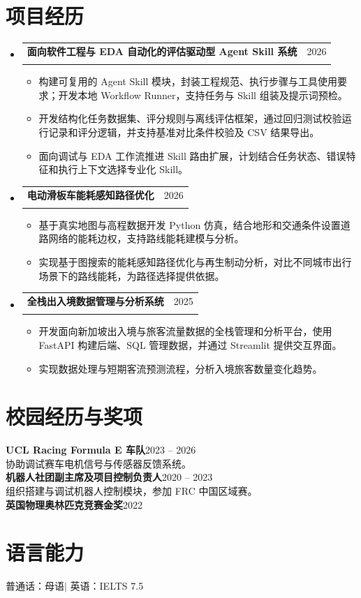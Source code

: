 ﻿\documentclass[a4paper,11pt]{article}
\makeatletter
\newcommand{\CVItem}[1]{\item\small #1}
\newcommand{\CVProjectHeading}[3]{%
  \item\begin{tabularx}{\textwidth}{@{}>{\raggedright\arraybackslash}X@{\hspace{1em}}r@{}}
    \textbf{#1} & #3 \\
    \multicolumn{2}{@{}l@{}}{\small #2}
  \end{tabularx}\vspace{-3pt}}
\newcommand{\CVSubHeadingListStart}{\begin{itemize}[leftmargin=0pt,label={},itemsep=4pt,topsep=0pt,parsep=0pt,partopsep=0pt]}
\newcommand{\CVSubHeadingListEnd}{\end{itemize}}
\newcommand{\CVItemListStart}{\begin{itemize}[leftmargin=0.4cm,label=\textbullet,itemsep=1pt,topsep=2pt,parsep=0pt,partopsep=0pt]}
\newcommand{\CVItemListEnd}{\end{itemize}}
\makeatother
\begin{document}
\section{项目经历}
\CVSubHeadingListStart
  \CVProjectHeading{面向软件工程与 EDA 自动化的评估驱动型 Agent Skill 系统}
    {Python / LLM Agents / Evaluation Harness / EDA Automation}{2026}
  \CVItemListStart
    \CVItem{构建可复用的 Agent Skill 模块，封装工程规范、执行步骤与工具使用要求；开发本地 Workflow Runner，支持任务与 Skill 组装及提示词预检。}
    \CVItem{开发结构化任务数据集、评分规则与离线评估框架，通过回归测试校验运行记录和评分逻辑，并支持基准对比条件校验及 CSV 结果导出。}
    \CVItem{面向调试与 EDA 工作流推进 Skill 路由扩展，计划结合任务状态、错误特征和执行上下文选择专业化 Skill。}
  \CVItemListEnd
  \CVProjectHeading{电动滑板车能耗感知路径优化}
    {Python / Graph Algorithms / OpenStreetMap}{2026}
  \CVItemListStart
    \CVItem{基于真实地图与高程数据开发 Python 仿真，结合地形和交通条件设置道路网络的能耗边权，支持路线能耗建模与分析。}
    \CVItem{实现基于图搜索的能耗感知路径优化与再生制动分析，对比不同城市出行场景下的路线能耗，为路径选择提供依据。}
  \CVItemListEnd
  \CVProjectHeading{全栈出入境数据管理与分析系统}
    {FastAPI / Streamlit / SQL}{2025}
  \CVItemListStart
    \CVItem{开发面向新加坡出入境与旅客流量数据的全栈管理和分析平台，使用 FastAPI 构建后端、SQL 管理数据，并通过 Streamlit 提供交互界面。}
    \CVItem{实现数据处理与短期客流预测流程，分析入境旅客数量变化趋势。}
  \CVItemListEnd
\CVSubHeadingListEnd
\section{校园经历与奖项}
{\small
\textbf{UCL Racing Formula E 车队}\hfill 2023 -- 2026\\
协助调试赛车电机信号与传感器反馈系统。\\
\textbf{机器人社团副主席及项目控制负责人}\hfill 2020 -- 2023\\
组织搭建与调试机器人控制模块，参加 FRC 中国区域赛。\\
\textbf{英国物理奥林匹克竞赛金奖}\hfill 2022\par}
\section{语言能力}
{\small 普通话：母语\quad $|$ \quad 英语：IELTS 7.5}
\end{document}
